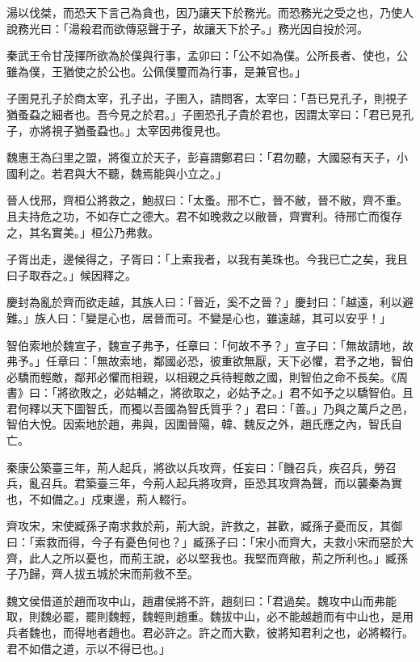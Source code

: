 
\begin{pinyinscope}
湯以伐桀，而恐天下言己為貪也，因乃讓天下於務光。而恐務光之受之也，乃使人說務光曰：「湯殺君而欲傳惡聲于子，故讓天下於子。」務光因自投於河。

秦武王令甘茂擇所欲為於僕與行事，孟卯曰：「公不如為僕。公所長者、使也，公雖為僕，王猶使之於公也。公佩僕璽而為行事，是兼官也。」

子圉見孔子於商太宰，孔子出，子圉入，請問客，太宰曰：「吾已見孔子，則視子猶蚤蝨之細者也。吾今見之於君。」子圉恐孔子貴於君也，因謂太宰曰：「君已見孔子，亦將視子猶蚤蝨也。」太宰因弗復見也。

魏惠王為臼里之盟，將復立於天子，彭喜謂鄭君曰：「君勿聽，大國惡有天子，小國利之。若君與大不聽，魏焉能與小立之。」

晉人伐邢，齊桓公將救之，鮑叔曰：「太蚤。邢不亡，晉不敝，晉不敝，齊不重。且夫持危之功，不如存亡之德大。君不如晚救之以敝晉，齊實利。待邢亡而復存之，其名實美。」桓公乃弗救。

子胥出走，邊候得之，子胥曰：「上索我者，以我有美珠也。今我已亡之矣，我且曰子取吞之。」候因釋之。

慶封為亂於齊而欲走越，其族人曰：「晉近，奚不之晉？」慶封曰：「越遠，利以避難。」族人曰：「變是心也，居晉而可。不變是心也，雖遠越，其可以安乎！」

智伯索地於魏宣子，魏宣子弗予，任章曰：「何故不予？」宣子曰：「無故請地，故弗予。」任章曰：「無故索地，鄰國必恐，彼重欲無厭，天下必懼，君予之地，智伯必驕而輕敵，鄰邦必懼而相親，以相親之兵待輕敵之國，則智伯之命不長矣。《周書》曰：「將欲敗之，必姑輔之，將欲取之，必姑予之。」君不如予之以驕智伯。且君何釋以天下圖智氏，而獨以吾國為智氏質乎？」君曰：「善。」乃與之萬戶之邑，智伯大悅。因索地於趙，弗與，因圍晉陽，韓、魏反之外，趙氏應之內，智氏自亡。

秦康公築臺三年，荊人起兵，將欲以兵攻齊，任妄曰：「饑召兵，疾召兵，勞召兵，亂召兵。君築臺三年，今荊人起兵將攻齊，臣恐其攻齊為聲，而以襲秦為實也，不如備之。」戍東邊，荊人輟行。

齊攻宋，宋使臧孫子南求救於荊，荊大說，許救之，甚歡，臧孫子憂而反，其御曰：「索救而得，今子有憂色何也？」臧孫子曰：「宋小而齊大，夫救小宋而惡於大齊，此人之所以憂也，而荊王說，必以堅我也。我堅而齊敝，荊之所利也。」臧孫子乃歸，齊人拔五城於宋而荊救不至。

魏文侯借道於趙而攻中山，趙肅侯將不許，趙刻曰：「君過矣。魏攻中山而弗能取，則魏必罷，罷則魏輕，魏輕則趙重。魏拔中山，必不能越趙而有中山也，是用兵者魏也，而得地者趙也。君必許之。許之而大歡，彼將知君利之也，必將輟行。君不如借之道，示以不得已也。」


\end{pinyinscope}
